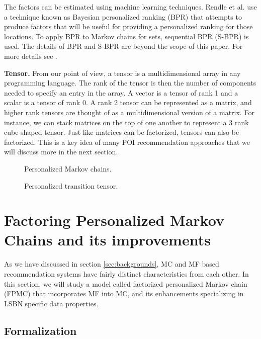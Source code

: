 \documentclass{sig-alternate}
\begin{document}
The factors can be estimated using machine learning techniques.
Rendle et al. \cite{Rendle:2009:BBP} use a technique known as Bayesian personalized ranking (BPR) that attempts 
to produce factors that will be useful for providing a personalized ranking for those locations. 
To apply BPR to Markov chains for sets, sequential BPR (S-BPR) is used. 
The details of BPR and S-BPR are beyond the scope of this paper. For more details see \cite{Rendle:2009:BBP}.

\textbf{Tensor.} From our point of view, a tensor is a multidimensional array in any programming language.
The rank of the tensor is then the number of components needed to specify an entry in the array. 
A vector is a tensor of rank 1 and a scalar is a tensor 
of rank 0. A rank 2 tensor can be represented as a matrix, and higher rank tensors 
are thought of as a multidimensional version of a matrix. For instance, we can stack matrices on 
the top of one another to represent a 3 rank cube-shaped tensor.
Just like matrices can be factorized, tensors can also be factorized. 
This is a key idea of many POI recommendation approaches 
that we will discuss more in the next section.

\begin{figure}
\centering
{}
\caption{Personalized Markov chains. \cite{Rendle:2010:FPM}}
\label{fig:FPMC_naive}
\end{figure}

\begin{figure}
\centering
{}
\caption{Personalized transition tensor. \cite{Rendle:2010:FPM}}
\label{fig:FPMC}
\end{figure}

\section{Factoring Personalized Markov Chains and its improvements}
\label{sec:fpmc}

As we have discussed in section \ref{sec:backgrounds}, MC and MF based recommendation systems
have fairly distinct characteristics from each other. In this section, we will study a model called 
factorized personalized Markov chain (FPMC) that incorporates MF into MC, and its 
enhancements specializing in LSBN specific data properties.

\subsection{Formalization}
\label{sec:typeChangesSpecialChars}
\end{document}
